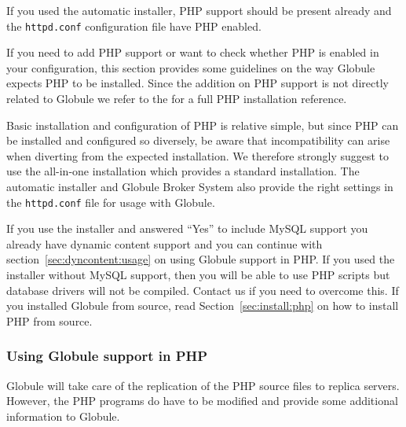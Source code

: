 \documentclass[10pt,a4paper]{article}
\makeatletter
\newenvironment{p}{\@open{P}{}}{\@close{P}}
\newenvironment{p}{}{\par}
\makeatother
\begin{document}
\begin{p}
If you used the automatic installer, PHP support should be present already and
the \verb!httpd.conf! configuration file have PHP enabled.
\end{p}

\begin{p}
If you need to add PHP support or want to check whether PHP is enabled in your
configuration, this section provides some guidelines on the way Globule
expects PHP to be installed.  Since the addition on PHP support is not
directly related to Globule we refer to the
for a full PHP installation reference.
\end{p}

\begin{p}
Basic installation and configuration of PHP is relative simple, but since PHP
can be installed and configured so diversely, be aware that incompatibility
can arise when diverting from the expected installation.  We therefore
strongly suggest to use the all-in-one installation which provides a standard
installation.  The automatic installer and Globule Broker System also provide
the right settings in the \verb!httpd.conf! file for usage with Globule.
\end{p}

\begin{p}
If you use the installer and answered ``Yes'' to include MySQL support you
already have dynamic content support and you can continue with
section~\ref{sec:dyncontent:usage} on using Globule support in PHP.  If you
used the installer without MySQL support, then you will be able to use PHP
scripts but database drivers will not be compiled.  Contact us if you need to
overcome this.  If you installed Globule from source, read
Section~\ref{sec:install:php} on how to install PHP from source.
\end{p}

\subsubsection{\label{sec:dyncontent:usage}
  Using Globule support in PHP}

\begin{p}
Globule will take care of the replication of the PHP source files to replica
servers.  However, the PHP programs do have to be modified and provide some
additional information to Globule.
\end{p}
\end{document}
